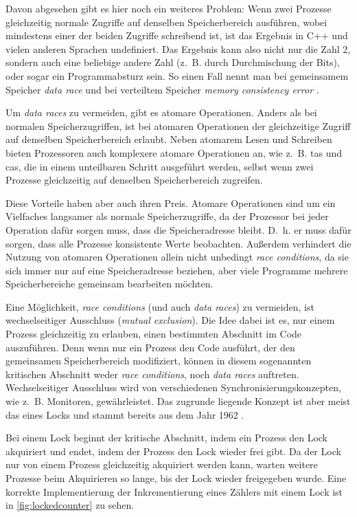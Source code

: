 Davon abgesehen gibt es hier noch ein weiteres Problem:
Wenn zwei Prozesse gleichzeitig normale Zugriffe auf denselben Speicherbereich ausführen,
wobei mindestens einer der beiden Zugriffe schreibend ist,
ist das Ergebnis in C++ und vielen anderen Sprachen undefiniert.
Das Ergebnis kann also nicht nur die Zahl 2,
sondern auch eine beliebige andere Zahl (z.~B. durch Durchmischung der Bits),
oder sogar ein Programmabsturz sein.
So einen Fall nennt man bei gemeinsamem Speicher \textit{data race} \cite{RacerX} \cite{Chord} \cite{LOCKSMITH} \cite{PACER} \cite{DejaVu} \cite{Eraser} \cite{RaceTrack}
und bei verteiltem Speicher \textit{memory consistency error} \cite{MC-Checker} \cite{MC-CChecker}.

Um \textit{data races} zu vermeiden,
gibt es atomare Operationen.
Anders als bei normalen Speicherzugriffen,
ist bei atomaren Operationen der gleichzeitige Zugriff auf denselben Speicherbereich erlaubt.
Neben atomarem Lesen und Schreiben bieten Prozessoren auch komplexere atomare Operationen an,
wie z.~B. \gls{tas} und \gls{cas},
die in einem unteilbaren Schritt ausgeführt werden,
selbst wenn zwei Prozesse gleichzeitig auf denselben Speicherbereich zugreifen.

Diese Vorteile haben aber auch ihren Preis.
Atomare Operationen sind um ein Vielfaches langsamer
als normale Speicherzugriffe,
da der Prozessor bei jeder Operation dafür sorgen muss,
dass die Speicheradresse  bleibt.
D.~h. er muss dafür sorgen,
dass alle Prozesse konsistente Werte beobachten.
Außerdem verhindert die Nutzung von atomaren Operationen allein nicht unbedingt \textit{race conditions},
da sie sich immer nur auf eine Speicheradresse beziehen,
aber viele Programme mehrere Speicherbereiche gemeinsam bearbeiten möchten.

Eine Möglichkeit,
\textit{race conditions} (und auch \textit{data races}) zu vermeiden,
ist wechselseitiger Ausschluss (\textit{mutual exclusion}).
Die Idee dabei ist es,
nur einem Prozess gleichzeitig zu erlauben,
einen bestimmten Abschnitt im Code auszuführen.
Denn wenn nur ein Prozess den Code ausführt,
der den gemeinsamen Speicherbereich modifiziert,
können in diesem sogenannten kritischen Abschnitt weder \textit{race conditions},
noch \textit{data races} auftreten.
Wechselseitiger Ausschluss wird von verschiedenen Synchronisierungskonzepten,
wie z.~B. Monitoren,
gewährleistet.
Das zugrunde liegende Konzept ist aber meist das eines Locks und stammt bereits aus dem Jahr 1962 \cite{Locks}.

Bei einem Lock beginnt der kritische Abschnitt,
indem ein Prozess den Lock akquiriert
und endet, indem der Prozess den Lock wieder frei gibt.
Da der Lock nur von einem Prozess gleichzeitig akquiriert werden kann,
warten weitere Prozesse beim Akquirieren so lange,
bis der Lock wieder freigegeben wurde.
Eine korrekte Implementierung der Inkrementierung eines Zählers mit einem Lock ist in \autoref{fig:lockedcounter} zu sehen.

